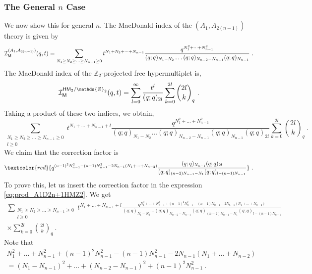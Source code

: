 \documentclass[a4paper,10pt]{article}
\newcommand{\mr}[1]{\mathsf{#1}}
\def\CI {{\cal I}}
\def\CI {{{\cal I}}}
\begin{document}
\subsubsection{The General $n$ Case}
We now show this for general $n$. The MacDonald index of the $(A_1,A_{2(n-1)})$ theory is given by \cite{Buican:2015tda}
\begin{equation}
    \CI_{\mr{M}}^{(A_1,A_{2(n-1)})}(q,t)=\sum_{N_1\geq N_2\geq\dots\geq N_{n-1}\geq 0}t^{N_1+N_2+\dots+N_{n-1}}\frac{q^{N_1^2+\dots+N_{n-1}^2}}{(q;q)_{N_1-N_2}\dots (q;q)_{N_{n-2}-N_{n-1}}(q;q)_{N_{n-1}}}~.
\end{equation}
The MacDonald index of the $\mathds{Z}_2$-projected free hypermultiplet is,
\begin{equation}
    \CI_{\mr{M}}^{\mr{HM}_2/\mathds{Z}_2}(q,t)=\sum_{l=0}^{\infty}\frac{t^l}{(q;q)_{2l}}\sum_{k=0}^{2l}{2l\choose k}_q~.
\end{equation}
Taking a product of these two indices, we obtain,
\begin{equation}\label{eq:prod_A1D2n+1HMZ2}
    \sum_{\substack{N_1\geq N_2\geq\dots\geq N_{n-1}\geq 0\\l\geq 0}}t^{N_1+\dots+N_{n-1}+l}\frac{q^{N_1^2+\dots+N_{n-1}^2}}{(q;q)_{N_1-N_2}\dots (q;q)_{N_{n-2}-N_{n-1}}(q;q)_{N_{n-1}}(q;q)_{2l}}\sum_{k=0}^{2l}{2l\choose k}_q~.
\end{equation} 
We claim that the correction factor is 
\begin{equation}
    \textcolor{red}{q^{(n-1)^2N_{n-1}^2-(n-1)N_{n-1}^2-2N_{n-1}(N_1+\dots+N_{n-2})}\frac{(q;q)_{N_{n-1}}(q;q)_{2l}}{(q;q)_{(n-2)N_{n-1}-N_1}(q;q)_{l-(n-1)N_{n-1}}}}~.
\end{equation}
To prove this, let us insert the correction factor in the expression \eqref{eq:prod_A1D2n+1HMZ2}. We get 
\begin{equation}
\begin{split}
\sum_{\substack{N_1\geq N_2\geq\dots\geq N_{n-1}\geq 0\\l\geq 0}}t^{N_1+\dots+N_{n-1}+l}\frac{q^{N_1^2+\dots+N_{n-1}^2+(n-1)^2N_{n-1}^2-(n-1)N_{n-1}-2N_{n-1}(N_1+\dots+N_{n-2})}}{(q;q)_{N_1-N_2}\dots (q;q)_{N_{n-2}-N_{n-1}}(q;q)_{(n-2)N_{n-1}-N_1}(q;q)_{l-(n-1)N_{n-1}}}\\\times\sum_{k=0}^{2l}{2l\choose k}_q~. 
\end{split}
\end{equation}
Note that 
\begin{equation}
\begin{split}
    N_1^2+\dots+N_{n-1}^2+(n-1)^2N_{n-1}^2-(n-1)N_{n-1}^2-2N_{n-1}(N_1+\dots+N_{n-2})\\=(N_1-N_{n-1})^2+\dots+(N_{n-2}-N_{n-1})^2+(n-1)^2N_{n-1}^2~.
\end{split}
\end{equation}
\end{document}
